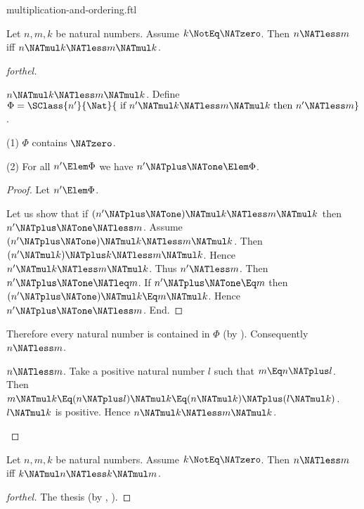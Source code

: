 \documentclass{stex}
\begin{document}
\begin{smodule}{multiplication-and-ordering.ftl}

\begin{proposition}[forthel,id=ARITHMETIC_06_8817333933965312]
  Let $n, m, k$ be natural numbers.
  Assume $k \NotEq \NATzero$.
  Then $n \NATless m$ iff $n \NATmul k \NATless m \NATmul k$.
\end{proposition}
\begin{proof}[forthel]
  \begin{case}{$n \NATmul k \NATless m \NATmul k$.}
    Define $\Phi = \SClass{n'}{\Nat}{\text{ if }n' \NATmul k \NATless m \NATmul k\text{ then }n' \NATless m}$.

    (1) $\Phi$ contains $\NATzero$.

    (2) For all $n' \Elem \Phi$ we have $n' \NATplus \NATone \Elem \Phi$.
    \begin{proof}
      Let $n' \Elem \Phi$.

      Let us show that if $(n' \NATplus \NATone) \NATmul k \NATless m \NATmul k$ then $n' \NATplus \NATone \NATless m$.
        Assume $(n' \NATplus \NATone) \NATmul k \NATless m \NATmul k$.
        Then $(n' \NATmul k) \NATplus k \NATless m \NATmul k$.
        Hence $n' \NATmul k \NATless m \NATmul k$.
        Thus $n' \NATless m$.
        Then $n' \NATplus \NATone \NATleq m$.
        If $n' \NATplus \NATone \Eq m$ then $(n' \NATplus \NATone) \NATmul k \Eq m \NATmul k$.
        Hence $n' \NATplus \NATone \NATless m$.
      End.
    \end{proof}

    Therefore every natural number is contained in $\Phi$ (by ).
    Consequently $n \NATless m$.
  \end{case}

  \begin{case}{$n \NATless m$.}
    Take a positive natural number $l$ such that $m \Eq n \NATplus l$.
    Then $m \NATmul k \Eq (n \NATplus l) \NATmul k \Eq (n \NATmul k) \NATplus (l \NATmul k)$.
    $l \NATmul k$ is positive.
    Hence $n \NATmul k \NATless m \NATmul k$.
  \end{case}
\end{proof}

\begin{corollary}[forthel,id=ARITHMETIC_06_5048640368279552]
  Let $n, m, k$ be natural numbers.
  Assume $k \NotEq \NATzero$.
  Then $n \NATless m$ iff $k \NATmul n \NATless k \NATmul m$.
\end{corollary}
\begin{proof}[forthel]
  The thesis (by , ).
\end{proof}


\end{smodule}
\end{document}
